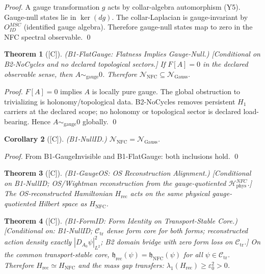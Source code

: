 \documentclass[12pt,oneside]{amsbook}
\theoremstyle{plain}
\newtheorem{theorem}{Theorem}[section]
\newtheorem{corollary}[theorem]{Corollary}
\theoremstyle{definition}
\theoremstyle{remark}
\newcommand{\status}[1]{\textup{[#1]}}
\begin{document}
\begin{proof}
A gauge transformation $g$ acts by collar-algebra automorphism (Y5).
Gauge-null states lie in $\ker(dg)$. The collar-Laplacian is
gauge-invariant by $O_{ID}^{MSC}$ (identified gauge algebra).
Therefore gauge-null states map to zero in the NFC spectral observable.
\qed
\end{proof}

\begin{theorem}[\status{C}]\label{thm:B1-flat-gauge}
\textup{(B1-FlatGauge: Flatness Implies Gauge-Null.)}
\textup{[Conditional on B2-NoCycles and no declared topological sectors.]}
If $F[A]=0$ in the declared observable sense, then
$A\sim_{\mathrm{gauge}} 0$.
Therefore $\mathcal{N}_{\mathrm{NFC}}\subseteq\mathcal{N}_{\mathrm{Gauss}}$.
\end{theorem}

\begin{proof}
$F[A]=0$ implies $A$ is locally pure gauge. The global obstruction to
trivializing is holonomy/topological data. B2-NoCycles removes persistent
$H_1$ carriers at the declared scope; no holonomy or topological sector
is declared load-bearing. Hence $A\sim_{\mathrm{gauge}} 0$ globally.
\qed
\end{proof}

\begin{corollary}[\status{C}]\label{cor:B1-NullID}
\textup{(B1-NullID.)}
$\mathcal{N}_{\mathrm{NFC}} = \mathcal{N}_{\mathrm{Gauss}}$.
\end{corollary}

\begin{proof}
From B1-GaugeInvisible and B1-FlatGauge: both inclusions hold.
\qed
\end{proof}

\begin{theorem}[\status{C}]\label{thm:B1-GaugeOS}
\textup{(B1-GaugeOS: OS Reconstruction Alignment.)}
\textup{[Conditional on B1-NullID; OS/Wightman reconstruction from the
gauge-quotiented $\mathcal{H}_{\mathrm{phys}}^{NFC}$.]}
The OS-reconstructed Hamiltonian $H_{\mathrm{rec}}$ acts on the same
physical gauge-quotiented Hilbert space as $H_{\mathrm{NFC}}$.
\end{theorem}

\begin{theorem}[\status{C}]\label{thm:B1-FormID}
\textup{(B1-FormID: Form Identity on Transport-Stable Core.)}
\textup{[Conditional on: B1-NullID; $\mathcal{C}_{\mathrm{tr}}$ dense
form core for both forms; reconstructed action density exactly
$|D_{A_0}\psi|_{L^2}^2$; B2 domain bridge with zero form loss on
$\mathcal{C}_{\mathrm{tr}}$.]}
On the common transport-stable core,
$\mathfrak{h}_{\mathrm{rec}}(\psi) = \mathfrak{h}_{\mathrm{NFC}}(\psi)$
for all $\psi\in\mathcal{C}_{\mathrm{tr}}$.
Therefore $H_{\mathrm{rec}}\simeq H_{\mathrm{NFC}}$ and the mass gap
transfers: $\lambda_1(H_{\mathrm{rec}})\ge\varepsilon_0^2 > 0$.
\end{theorem}
\end{document}
